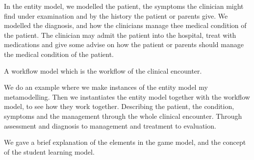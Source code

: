 In the entity model, we modelled the patient, the symptoms the clinician might find under examination and by the history the patient or parents give. We modelled the diagnosis, and how the clinicians manage thee medical condition of the patient. The clinician may admit the patient into the hospital, treat with medications and give some advise on how the patient or parents should manage the medical condition of the patient.

A workflow model which is the workflow of the clinical encounter.

We do an example where we make instances of the entity model my metamodelling. Then we instantiates the entity model together with the workflow model, to see how they work together. Describing the patient, the condition, symptoms and the management through the whole clinical encounter. Through assessment and diagnosis to management and treatment to evaluation.

We gave a brief explanation of the elements in the game model, and the concept of the student learning model. 